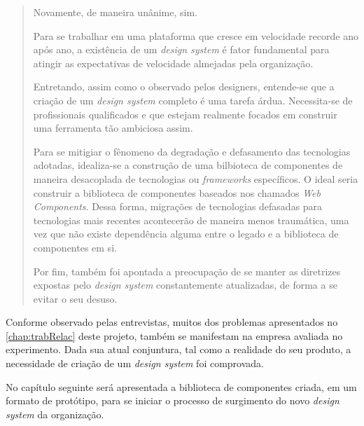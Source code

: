 \begin{quote}
    Novamente, de maneira unânime, sim.

    Para se trabalhar em uma plataforma que cresce em velocidade recorde ano após ano, a existência de um \textit{design system} é fator fundamental para atingir as expectativas de velocidade almejadas pela organização.
    
    Entretando, assim como o observado pelos designers, entende-se que a criação de um \textit{design system} completo é uma tarefa árdua. Necessita-se de profissionais qualificados e que estejam realmente focados em construir uma ferramenta tão ambiciosa assim.
    
    Para se mitigiar o fênomeno da degradação e defasamento das tecnologias adotadas, idealiza-se a construção de uma bilbioteca de componentes de maneira desacoplada de tecnologias ou \textit{frameworks} específicos. O ideal seria construir a biblioteca de componentes baseados nos chamados \textit{Web Components}. Dessa forma, migrações de tecnologias defasadas para tecnologias mais recentes acontecerão de maneira menos traumática, uma vez que não existe dependência alguma entre o legado e a biblioteca de componentes em si.
    
    Por fim, também foi apontada a preocupação de se manter as diretrizes expostas pelo \textit{design system} constantemente atualizadas, de forma a se evitar o seu desuso.
\end{quote}

Conforme observado pelas entrevistas, muitos dos problemas apresentados no \autoref{chap:trabRelac} deste projeto, também se manifestam na empresa avaliada no experimento. Dada sua atual conjuntura, tal como a realidade do seu produto, a necessidade de criação de um \textit{design system} foi comprovada.

No capítulo seguinte será apresentada a biblioteca de componentes criada, em um formato de protótipo, para se iniciar o processo de surgimento do novo \textit{design system} da organização.
